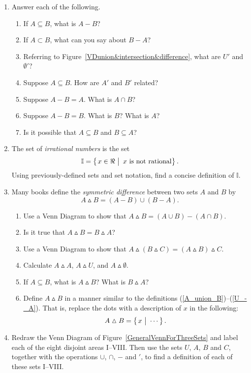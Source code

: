 \begin{multicols}{2}
\begin{enumerate}
\item Answer each of the following.
\begin{enumerate} 
\item If $A\subseteq B$, what is $A-B$?
\item If $A\subset B$, what can you say about $B-A$?
\item Referring to Figure~\ref{VDunion&intersection&difference},
what are $U'$ and $\emptyset'$?
\item Suppose $A\subseteq B$.  How are $A'$ and $B'$ related?
\item Suppose $A-B=A$.  What is $A\cap B$?
\item Suppose $A-B=B$.  What is $B$?  What is $A$? 
\item Is it possible that $A\subseteq B$ and $B\subseteq A$?
\end{enumerate}


\item The set of  {\it irrational numbers} is the set
$$\mathbb{I}=\left\{\left.\vphantom{X_9^9}x\in\Re\ \right| 
\    x\text{ is not rational}\right\}.$$ 
Using previously-defined sets and set notation, find a concise
definition of  $\mathbb{I}$.

\item Many books define the {\it symmetric difference}
between two sets $A$ and $B$ by
\begin{equation}
A\vartriangle B=(A-B)\cup(B-A).\end{equation}
\begin{enumerate}
\item Use a Venn Diagram to show that 
$A\vartriangle B=(A\cup B)-(A\cap B)$.
\item Is it true that $A\vartriangle B=B\vartriangle A$?
\item Use a Venn Diagram to show 
that $A\vartriangle(B\vartriangle C)
=(A\vartriangle B)\vartriangle C$.
\item Calculate $A\vartriangle A$,
$A\vartriangle U$, and $A\vartriangle\emptyset$.
\item If $A\subseteq B$, what is $A\vartriangle B$?
      What is $B\vartriangle A$?
\item Define $A\vartriangle B$ in a manner similar to 
the definitions (\ref{A_union_B})--(\ref{U_-_A}). That is,
replace the dots with a description of $x$ in the following:
$$A\vartriangle B=\left\{\left.\vphantom{X_0^9} x\
\right|\ \cdots\right\}.$$ 
\end{enumerate}
\item Redraw the Venn Diagram of Figure~\ref{GeneralVennForThreeSets} 
and label each of the eight disjoint areas I--VIII.
Then use the sets $U$, $A$, $B$ and $C$, together with the 
operations $\cup$, $\cap$, $-$ and $'$, to find a definition
of each of these sets I--VIII.


\end{enumerate}
\end{multicols}

